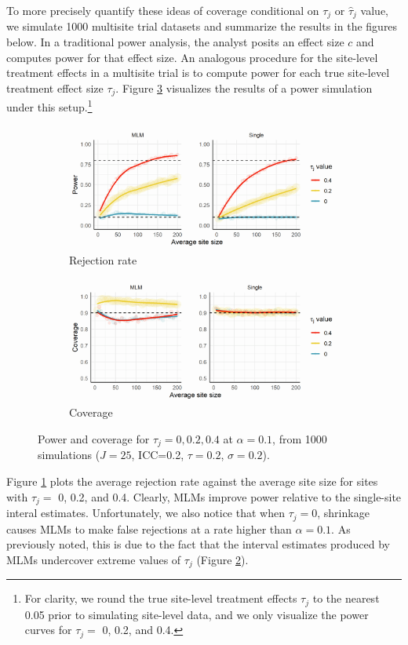 \documentclass[]{article}
\begin{document}
To more precisely quantify these ideas of coverage conditional on $\tau_j$ or $\hat{\tau}_j$ value, we simulate 1000 multisite trial datasets and summarize the results in the figures below.
In a traditional power analysis, the analyst posits an effect size $c$ and computes power for that effect size.
An analogous procedure for the site-level treatment effects in a multisite trial is to compute power for each true site-level treatment effect size $\tau_j$.
Figure \ref{fig:pcp1} visualizes the results of a power simulation under this setup.\footnote{For clarity, we round the true site-level treatment effects $\tau_j$ to the nearest 0.05 prior to simulating site-level data, and we only visualize the power curves for $\tau_j =$ 0, 0.2, and 0.4.}
\begin{figure}[ht]
    \centering
    \begin{subfigure}[a]{\textwidth}
    	\includegraphics[width=\textwidth]{pp1}
        \caption{Rejection rate}
    	\label{fig:pp1}
    \end{subfigure}
    \vfill
    \begin{subfigure}[b]{\textwidth}
    	\includegraphics[width=\textwidth]{cp1}
        \caption{Coverage}
    	\label{fig:cp1}
    \end{subfigure}
    \caption{Power and coverage for $\tau_j = 0, 0.2, 0.4$ at $\alpha=0.1$, from 1000 simulations ($J=25$, ICC=0.2, $\tau=0.2$, $\sigma=0.2$).}
    \label{fig:pcp1}
\end{figure}
Figure \ref{fig:pp1} plots the average rejection rate against the average site size for sites with $\tau_j =$ 0, 0.2, and 0.4.
Clearly, MLMs improve power relative to the single-site interal estimates.
Unfortunately, we also notice that when $\tau_j = 0$, shrinkage causes MLMs to make false rejections at a rate higher than $\alpha=0.1$.
As previously noted, this is due to the fact that the interval estimates produced by MLMs undercover extreme values of $\tau_j$ (Figure \ref{fig:cp1}).
\end{document}
